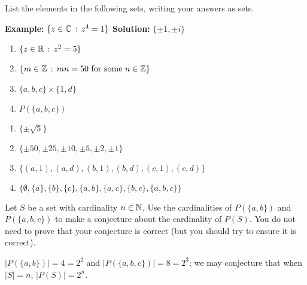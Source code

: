 \begin{exercise}[ID=1B]
List the elements in the following sets, writing your answers as sets.

\medskip
\textbf{Example:} $\{z\in \mathbb{C}\,:\,z^4=1\}$  \quad \textbf{Solution:} $\{\pm 1, \pm i\}$
\medskip

\begin{enumerate}

\item $\{z\in \mathbb{R}\,:\, z^2=5\}$

\item $\{m \in \mathbb{Z}\,:\, mn=50 \mbox{ for some }n\in \mathbb{Z}\}$

\item $\{a,b,c\}\times \{1,d\}$

\item $P(\{a,b,c\})$
\end{enumerate}

\end{exercise}

\begin{solution}[print=true]
\begin{enumerate}
\item $\{\pm\sqrt{5}\}$
\item $\{\pm 50, \pm 25, \pm 10, \pm 5, \pm 2, \pm 1\}$
\item $\{(a,1),(a,d), (b,1),(b,d),(c,1),(c,d)\}$
\item $\{\emptyset, \{a\}, \{b\},
    \{c\},\{a,b\},\{a,c\},\{b,c\}, \{a,b,c\}\}$
\end{enumerate}
\end{solution}

\begin{exercise}[ID=1C]
Let $S$ be a set with cardinality $n\in \mathbb{N}$. Use the cardinalities of $P(\{a,b\})$ and $P(\{a,b,c\})$ to make a conjecture about the cardinality of $P(S)$. You do not need to prove that your conjecture is correct (but you should try to ensure it is correct).

\end{exercise}

\begin{solution}[print=true]
$|P(\{a,b\})|=4=2^2$ and $|P(\{a,b,c\})|=8=2^3$; we may conjecture that when $|S|=n$, $|P(S)|=2^n$.

\end{solution}

